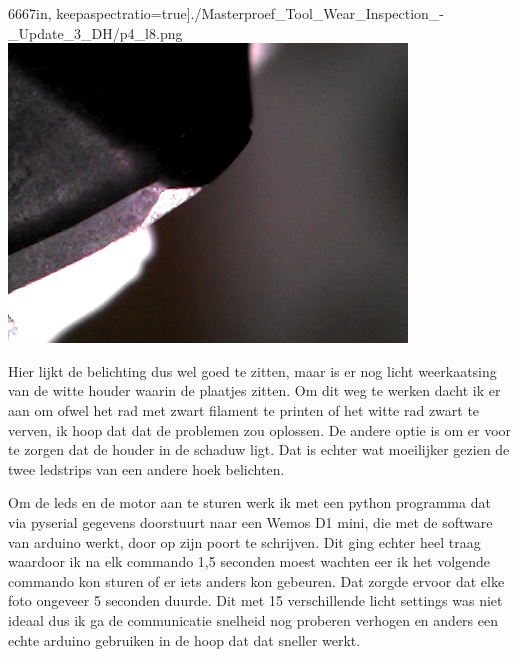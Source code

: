 \documentclass{scrartcl}
\begin{document}
6667in, keepaspectratio=true]{./Masterproef_Tool_Wear_Inspection_-_Update_3_DH/p4_l8.png}\includegraphics[width=4.166667in, keepaspectratio=true]{./Masterproef_Tool_Wear_Inspection_-_Update_3_DH/p4.png}

 

Hier lijkt de belichting dus wel goed te zitten, maar is er nog licht weerkaatsing van de witte houder waarin de plaatjes zitten. Om dit weg te werken dacht ik er aan om ofwel het rad met zwart filament te printen of het witte rad zwart te verven, ik hoop dat dat de problemen zou oplossen. De andere optie is om er voor te zorgen dat de houder in de schaduw ligt. Dat is echter wat moeilijker gezien de twee ledstrips van een andere hoek belichten.

 

Om de leds en de motor aan te sturen werk ik met een python programma dat via pyserial gegevens doorstuurt naar een Wemos D1 mini, die met de software van arduino werkt, door op zijn poort te schrijven. Dit ging echter heel traag waardoor ik na elk commando 1,5 seconden moest wachten eer ik het volgende commando kon sturen of er iets anders kon gebeuren. Dat zorgde ervoor dat elke foto ongeveer 5 seconden duurde. Dit met 15 verschillende licht settings was niet ideaal dus ik ga de communicatie snelheid nog proberen verhogen en anders een echte arduino gebruiken in de hoop dat dat sneller werkt.
\end{document}
